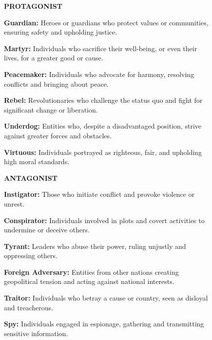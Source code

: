 




\begin{figure}[!ht]
    \centering
\begin{tcolorbox}
\scriptsize

\textbf{PROTAGONIST}
\medskip

\textbf{Guardian:} Heroes or guardians who protect values or communities, ensuring safety and upholding justice.

\noindent\textbf{Martyr:} Individuals who sacrifice their well-being, or even their lives, for a greater good or cause.

\noindent\textbf{Peacemaker:} Individuals who advocate for harmony, resolving conflicts and bringing about peace.

\noindent\textbf{Rebel:} Revolutionaries who challenge the status quo and fight for significant change or liberation.

\noindent\textbf{Underdog:} Entities who, despite a disadvantaged position, strive against greater forces and obstacles.

\noindent\textbf{Virtuous:} Individuals portrayed as righteous, fair, and upholding high moral standards.

\medskip

\noindent\textbf{ANTAGONIST}

\medskip

\noindent\textbf{Instigator:} Those who initiate conflict and provoke violence or unrest.

\noindent\textbf{Conspirator:} Individuals involved in plots and covert activities to undermine or deceive others.

\noindent\textbf{Tyrant:} Leaders who abuse their power, ruling unjustly and oppressing others.

\noindent\textbf{Foreign Adversary:} Entities from other nations creating geopolitical tension and acting against national interests.

\noindent\textbf{Traitor:} Individuals who betray a cause or country, seen as disloyal and treacherous.

\noindent\textbf{Spy:} Individuals engaged in espionage, gathering and transmitting sensitive information.


\end{tcolorbox}
\end{figure}
